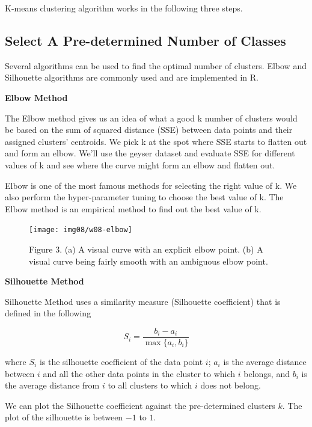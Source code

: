 \documentclass[
]{book}
\begin{document}
K-means clustering algorithm works in the following three steps.

\hypertarget{select-a-pre-determined-number-of-classes}{%
\subsection{Select A Pre-determined Number of Classes}\label{select-a-pre-determined-number-of-classes}}

Several algorithms can be used to find the optimal number of clusters. Elbow and Silhouette algorithms are commonly used and are implemented in R.

\textbf{Elbow Method}

The Elbow method gives us an idea of what a good k number of clusters would be based on the sum of squared distance (SSE) between data points and their assigned clusters' centroids. We pick k at the spot where SSE starts to flatten out and form an elbow. We'll use the geyser dataset and evaluate SSE for different values of k and see where the curve might form an elbow and flatten out.

Elbow is one of the most famous methods for selecting the right value of k. We also perform the hyper-parameter tuning to choose the best value of k. The Elbow method is an empirical method to find out the best value of k.

\begin{figure}

{\centering \texttt{[image: img08/w08-elbow]} 

}

\caption{Figure 3. (a) A visual curve with an explicit elbow point. (b) A visual curve being fairly smooth with an ambiguous elbow point.}\label{fig:unnamed-chunk-192}
\end{figure}

\textbf{Silhouette Method}

Silhouette Method uses a similarity measure (Silhouette coefficient) that is defined in the following

\[
S_i = \frac{b_i-a_i}{\max{ \{a_i, b_i\}}}
\]

where \(S_i\) is the silhouette coefficient of the data point \(i\); \(a_i\) is the average distance between \(i\) and all the other data points in the cluster to which \(i\) belongs, and \(b_i\) is the average distance from \(i\) to all clusters to which \(i\) does not belong.

We can plot the Silhouette coefficient against the pre-determined clusters \(k\). The plot of the silhouette is between \(-1\) to \(1\).
\end{document}
